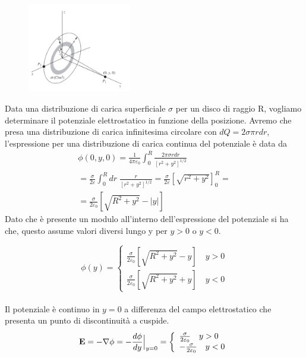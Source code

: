 \begin{figure}
\vspace{-0.3cm}
  \begin{center}
    \includegraphics[width=0.4\textwidth]{images/disco}
  \end{center}
\end{figure}

Data una distribuzione di carica superficiale $\sigma$ per un disco di raggio R, vogliamo determinare il potenziale elettrostatico in funzione della posizione. Avremo che presa una distribuzione di carica infinitesima circolare con $dQ = 2 \sigma \pi rdr$, l'espressione per una distribuzione di carica continua del potenziale \`e data da
\begin{equation*}
\begin{aligned}
	& \phi(0,y,0) = \frac{1}{4 \pi \varepsilon_0}\int_{0}^{R} \frac{2 \pi \sigma rdr}{[r^2 + y^2]^{1/2}}\\[0.5cm] & = \frac{\sigma}{2 \varepsilon} \int_{0}^{R}dr \; \frac{r}{[r^2+y^2]^{1/2}} = \frac{\sigma}{2 \varepsilon} \left [\sqrt{r^2+y^2}\right ]_{0}^{R} = & \\[0.5cm]
	& = \frac{\sigma}{2 \varepsilon_0}\left[ \sqrt{R^2+y^2} - |y| \right ]
\end{aligned}
\end{equation*}
Dato che \`e presente un modulo all'interno dell'espressione del potenziale si ha che, questo assume valori diversi lungo y per $y>0$ o $y<0$.

\begin{equation*}
	\phi(y) = \left \{ \begin{array}{l}
		\frac{\sigma }{2 \varepsilon_0} \left [ \sqrt{R^2+y^2} - y \right ] \quad y > 0 \\[0.5cm]
		\frac{\sigma}{2 \varepsilon_0} \left [ \sqrt{R^2+y^2} + y \right ] \quad y < 0
	\end{array}\right.
\end{equation*}
\\

\noindent Il potenziale \`e continuo in $y = 0$ a differenza del campo elettrostatico che presenta un punto di discontinuit\`a a cuspide.
\begin{equation*}
	\bold{E} = - \nabla \phi = -\frac{d \phi}{dy}\Big |_{y=0} = \left \{ \begin{array}{l}
		\frac{\sigma}{2 \varepsilon_0} \quad y>0 \\
		-\frac{\sigma}{2 \varepsilon_0} \quad y < 0
	\end{array}\right.
\end{equation*}
\begin{remark}	
\end{remark}

